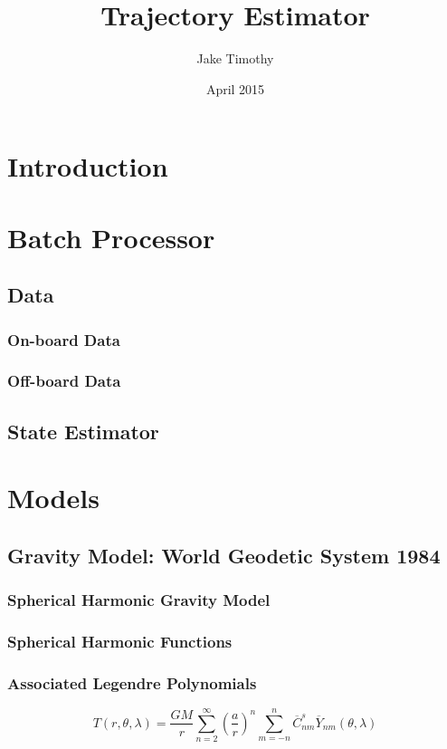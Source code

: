 \documentclass{article}
\title{Trajectory Estimator}
\author{Jake Timothy}
\date{April 2015}
\begin{document}
\maketitle

\section{Introduction}

\section{Batch Processor}
\subsection{Data}
\subsubsection{On-board Data}
\subsubsection{Off-board Data}

\subsection{State Estimator}

\section{Models}
\subsection{Gravity Model: World Geodetic System 1984}
\subsubsection{Spherical Harmonic Gravity Model}
\subsubsection{Spherical Harmonic Functions}
\subsubsection{Associated Legendre Polynomials}
\begin{equation}
T{\left(r,\theta,\lambda\right)} = \frac{G M}{r} \sum_{n=2}^\infty \left(\frac{a}{r}\right)^n \sum_{m=-n}^n \overline{C}_{n m}^s \overline{Y}_{n m}{\left(\theta,\lambda\right)}
\end{equation}
\end{document}
